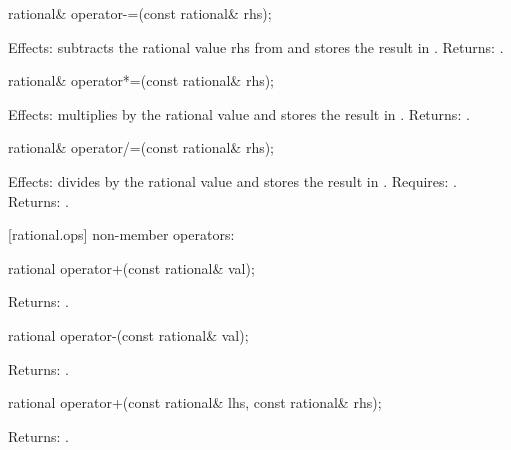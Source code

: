 \begin{itemdecl}
rational& operator-=(const rational& rhs);
\end{itemdecl}

\begin{itemdescr}
Effects: subtracts the rational value rhs from  and stores the result in .
Returns: .
\end{itemdescr}

\begin{itemdecl}
rational& operator*=(const rational& rhs);
\end{itemdecl}

\begin{itemdescr}
Effects: multiplies  by the rational value  and stores the result in .
Returns: .
\end{itemdescr}

\begin{itemdecl}
rational& operator/=(const rational& rhs);
\end{itemdecl}

\begin{itemdescr}
Effects: divides  by the rational value  and stores the result in .
Requires: .
Returns: .
\end{itemdescr}

[rational.ops]{ non-member operators:}

\begin{itemdecl}
rational operator+(const rational& val);
\end{itemdecl}

\begin{itemdescr}
Returns: .
\end{itemdescr}

\begin{itemdecl}
rational operator-(const rational& val);
\end{itemdecl}

\begin{itemdescr}
Returns: .
\end{itemdescr}

\begin{itemdecl}
rational operator+(const rational& lhs, const rational& rhs);
\end{itemdecl}

\begin{itemdescr}
Returns: .
\end{itemdescr}

